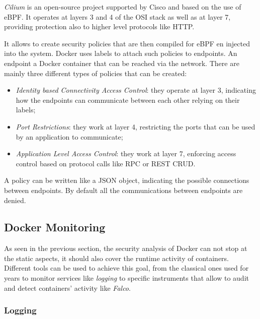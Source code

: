 \documentclass[a4paper,12pt]{article}
\begin{document}
\textit{Cilium} \cite{cilium_github} is an open-source project supported by
Cisco and based on the use of eBPF. It operates at layers 3 and 4 of the OSI
stack as well as at layer 7, providing protection also to higher level protocols
like HTTP. \par It allows to create security policies that are then compiled for
eBPF en injected into the system. Docker uses labels to attach such policies to
endpoints. An endpoint a Docker container that can be reached via the network.
There are mainly three different types of policies that can be created:
\begin{itemize}
  \item \textit{Identity based Connectivity Access Control}: they operate at
  layer 3, indicating how the endpoints can communicate between each other
  relying on their labels;
  \item \textit{Port Restrictions}: they work at layer 4, restricting the ports
  that can be used by an application to communicate;
  \item \textit{Application Level Access Control}: they work at layer 7,
  enforcing access control based on protocol calls like RPC or REST CRUD. 
\end{itemize} 
A policy can be written like a JSON object, indicating the possible connections
between endpoints. By default all the communications between endpoints are
denied.

\subsection{Docker Monitoring}

As seen in the previous section, the security analysis of Docker can not stop at
the static aspects, it should also cover the runtime activity of containers.
Different tools can be used to achieve this goal, from the classical ones used
for years to monitor services like \textit{logging} to specific instruments that
allow to audit and detect containers' activity like \textit{Falco}.

\subsubsection{Logging}
\end{document}

